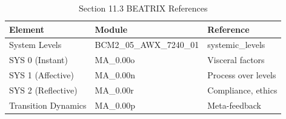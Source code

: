 \begin{table}[htbp]
\centering
\caption{Section 11.3 BEATRIX References}
\label{tab:11-3-beatrix}
\renewcommand{\arraystretch}{1.3}
\begin{tabular}{@{}lll@{}}
\toprule
\textbf{Element} & \textbf{Module} & \textbf{Reference} \\
\midrule
System Levels & BCM2\_05\_AWX\_7240\_01 & systemic\_levels \\
SYS 0 (Instant) & MA\_0.00o & Visceral factors \\
SYS 1 (Affective) & MA\_0.00n & Process over levels \\
SYS 2 (Reflective) & MA\_0.00r & Compliance, ethics \\
Transition Dynamics & MA\_0.00p & Meta-feedback \\
\bottomrule
\end{tabular}
\end{table}

